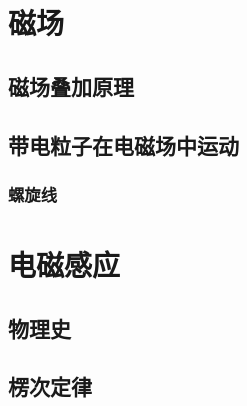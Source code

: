 \documentclass[cn,blue,11pt,normal]{elegantnote}
\begin{document}
\newpage
\section{磁场}
\subsection{磁场叠加原理}
\begin{proset}
	
\end{proset}
\begin{proset}
	
\end{proset}

\subsection{带电粒子在电磁场中运动}
\begin{proset}
	
\end{proset}
\begin{proset}
	
\end{proset}
\subsubsection{螺旋线}
\begin{proset}
	
\end{proset}


\newpage
\section{电磁感应}


\subsection{物理史}
\begin{proset}
	
\end{proset}

\subsection{楞次定律}
\begin{proset}
	
\end{proset}
\begin{proset}
	
\end{proset}
\end{document}
